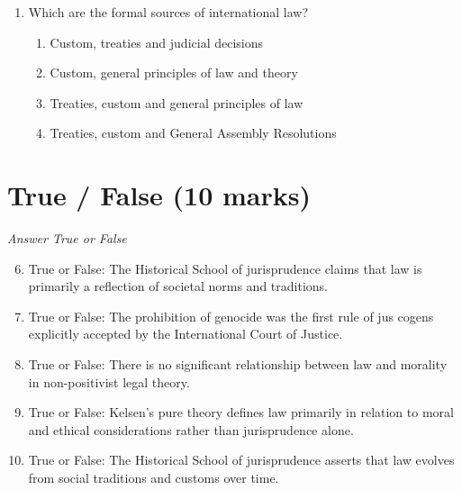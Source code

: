\documentclass[12pt]{article}
\begin{document}
\begin{enumerate}[label=\arabic*.]
\begin{enumerate}[label=(\alph*)]
    \item Piracy jure gentium is subject to flag State jurisdiction
    \item Piracy jure gentium is subject to universal jurisdiction
    \item Piracy jure gentium is subject to port State jurisdiction
    \item Piracy jure gentium is subject to nationality-based jurisdiction
\end{enumerate}
\item Which are the formal sources of international law?
\begin{enumerate}[label=(\alph*)]
    \item Custom, treaties and judicial decisions
    \item Custom, general principles of law and theory
    \item Treaties, custom and general principles of law
    \item Treaties, custom and General Assembly Resolutions
\end{enumerate}
\end{enumerate}

\section*{True / False (10 marks)}
\textit{Answer True or False}
\begin{enumerate}[label=\arabic*.]
\setcounter{enumi}{5}
\item True or False: The Historical School of jurisprudence claims that law is primarily a reflection of societal norms and traditions.
\item True or False: The prohibition of genocide was the first rule of jus cogens explicitly accepted by the International Court of Justice.
\item True or False: There is no significant relationship between law and morality in non-positivist legal theory.
\item True or False: Kelsen's pure theory defines law primarily in relation to moral and ethical considerations rather than jurisprudence alone.
\item True or False: The Historical School of jurisprudence asserts that law evolves from social traditions and customs over time.
\end{enumerate}
\end{document}
